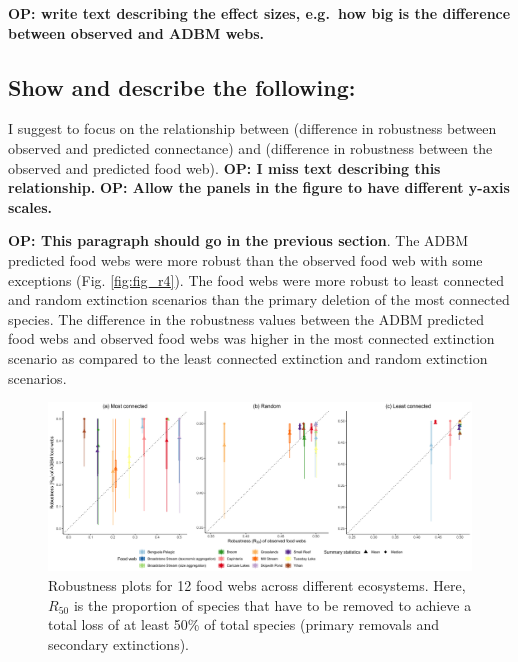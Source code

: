 \documentclass{article}
\begin{document}
\textbf{OP: write text describing the effect sizes, e.g.~how big is the
difference between observed and ADBM webs.}

\hypertarget{show-and-describe-the-following}{%
\subsection{Show and describe the
following:}\label{show-and-describe-the-following}}

I suggest to focus on the relationship between (difference in robustness
between observed and predicted connectance) and (difference in
robustness between the observed and predicted food web). \textbf{OP: I
miss text describing this relationship.} \textbf{OP: Allow the panels in
the figure to have different y-axis scales.}

\textbf{OP: This paragraph should go in the previous section}. The ADBM
predicted food webs were more robust than the observed food web with
some exceptions (Fig. \ref{fig:fig_r4}). The food webs were more robust
to least connected and random extinction scenarios than the primary
deletion of the most connected species. The difference in the robustness
values between the ADBM predicted food webs and observed food webs was
higher in the most connected extinction scenario as compared to the
least connected extinction and random extinction scenarios.

\begin{figure}

{\centering \includegraphics[width=450px]{../results/plot_R50_ADBM_vs_obs} 

}

\caption{\label{fig:fig_r4} Robustness plots for 12 food webs across different ecosystems. Here, $R_{50}$ is the proportion of species that have to be removed to achieve a total loss of at least 50\% of total species (primary removals and secondary extinctions).}\label{fig:unnamed-chunk-5}
\end{figure}
\end{document}

